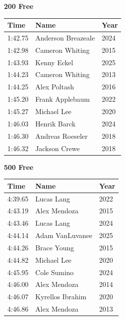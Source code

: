 \vspace{0.3em}
\vspace{1.2em}
\noindent\begin{minipage}[t]{0.48\textwidth}
\centering
\textbf{\textcolor{teamprimary}{200 Free}}\par
\vspace{0.5em}
\centering
\small
\renewcommand{\arraystretch}{1.0}
\setlength{\tabcolsep}{4pt}
\begin{tabular}{@{}p{1.8cm}p{3.0cm}p{1.0cm}@{}}
\toprule
\textbf{Time} & \textbf{Name} & \textbf{Year} \\
\midrule
1:42.75 & Anderson Breazeale & 2024 \\
1:42.98 & Cameron Whiting & 2015 \\
1:43.93 & Kenny Eckel & 2025 \\
1:44.23 & Cameron Whiting & 2013 \\
1:44.25 & Alex Poltash & 2016 \\
1:45.20 & Frank Applebaum & 2022 \\
1:45.27 & Michael Lee & 2020 \\
1:46.03 & Henrik Barck & 2024 \\
1:46.30 & Andreas Roeseler & 2018 \\
1:46.32 & Jackson Crewe & 2018 \\
\bottomrule
\end{tabular}
\end{minipage}
\hfill
\begin{minipage}[t]{0.48\textwidth}
\centering
\textbf{\textcolor{teamprimary}{500 Free}}\par
\vspace{0.5em}
\centering
\small
\renewcommand{\arraystretch}{1.0}
\setlength{\tabcolsep}{4pt}
\begin{tabular}{@{}p{1.8cm}p{3.0cm}p{1.0cm}@{}}
\toprule
\textbf{Time} & \textbf{Name} & \textbf{Year} \\
\midrule
4:39.65 & Lucas Lang & 2022 \\
4:43.19 & Alex Mendoza & 2015 \\
4:43.46 & Lucas Lang & 2024 \\
4:44.14 & Adam VanLuvanee & 2025 \\
4:44.26 & Brace Young & 2015 \\
4:44.82 & Michael Lee & 2020 \\
4:45.95 & Cole Sumino & 2024 \\
4:46.00 & Alex Mendoza & 2014 \\
4:46.07 & Kyrellos Ibrahim & 2020 \\
4:46.86 & Alex Mendoza & 2013 \\
\bottomrule
\end{tabular}
\end{minipage}
